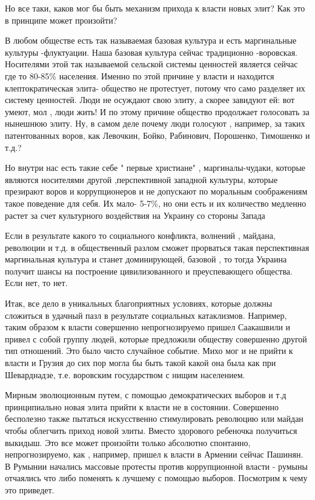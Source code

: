 Но все таки, каков  мог бы быть   механизм прихода к власти новых элит?   Как
это в принципе может произойти?

В любом обществе есть так называемая базовая культура и есть маргинальные
культуры -флуктуации.   Наша базовая культура сейчас  традиционно -воровская.
Носителями этой так называемой сельской системы ценностей является сейчас где
то 80-85\% населения.  Именно по этой причине у власти и находится
клептократическая элита- общество не протестует, потому что само разделяет их
систему ценностей. Люди не осуждают свою элиту, а скорее завидуют ей: вот
умеют, мол , люди жить!   И по этому причине   общество продолжает голосовать
за нынешнюю элиту. Ну, в самом деле почему люди голосуют , например, за таких
патентованных воров, как Левочкин, Бойко, Рабинович, Порошенко, Тимошенко и
т.д.?

Но внутри нас есть такие себе " первые христиане" , маргиналы-чудаки,
которые являются носителями  другой ,перспективной западной  культуры,
которые презирают воров и коррупционеров и не допускают по моральным
соображениям такое поведение для себя. Их мало- 5-7\%, но они есть и их
количество медленно растет за счет культурного  воздействия на Украину  со
стороны Запада

Если в результате какого то социального конфликта,  волнений , майдана,
революции и т.д.   в общественный разлом сможет прорваться такая перспективная
маргинальная культура и станет доминирующей, базовой , то тогда Украина получит
шансы на построение цивилизованного и преуспевающего общества.   Если нет, то
нет.  

Итак,  все дело в уникальных благоприятных условиях, которые должны сложиться в
удачный пазл в результате социальных катаклизмов. Например, таким образом
к власти  совершенно  непрогнозируемо пришел Саакашвили и  привел  с собой
группу людей, которые предложили обществу совершенно другой тип отношений.  Это
было чисто случайное событие. Михо мог и не прийти к власти и  Грузия до сих
пор  могла бы быть такой какой она была  как при Шеварднадзе, т.е. воровским
государством с нищим населением.

Мирным эволюционным  путем, с помощью демократических выборов и т.д
принципиально новая элита прийти к власти не в состоянии.  Совершенно
бесполезно также пытаться искусственно  стимулировать революцию или майдан
чтобы облегчить приход новой элиты.  Вместо здорового ребеночка получиться
выкидыш.  Это все может произойти  только абсолютно спонтанно, непрогнозируемо,
как , например, пришел к власти в Армении сейчас Пашинян.  В Румынии начались
массовые протесты против коррупционной власти - румыны отчаялись что либо
поменять к лучшему с помощью выборов.   Посмотрим к чему это приведет.

